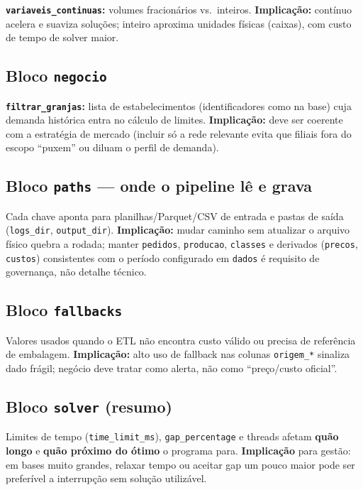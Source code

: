 \documentclass[11pt,a4paper]{article}
\begin{document}
\textbf{\texttt{variaveis\_continuas}:} volumes fracionários vs.\ inteiros.
\textbf{Implicação:} contínuo acelera e suaviza soluções; inteiro aproxima
unidades físicas (caixas), com custo de tempo de solver maior.

\subsection{Bloco \texttt{negocio}}

\textbf{\texttt{filtrar\_granjas}:} lista de estabelecimentos (identificadores
como na base) cuja demanda histórica entra no cálculo de limites. \textbf{Implicação:}
deve ser coerente com a estratégia de mercado (incluir só a rede relevante evita
que filiais fora do escopo ``puxem'' ou diluam o perfil de demanda).

\subsection{Bloco \texttt{paths} --- onde o pipeline lê e grava}

Cada chave aponta para planilhas/Parquet/CSV de entrada e pastas de saída
(\texttt{logs\_dir}, \texttt{output\_dir}). \textbf{Implicação:} mudar caminho
sem atualizar o arquivo físico quebra a rodada; manter \texttt{pedidos},
\texttt{producao}, \texttt{classes} e derivados (\texttt{precos},
\texttt{custos}) consistentes com o período configurado em \texttt{dados} é
requisito de governança, não detalhe técnico.

\subsection{Bloco \texttt{fallbacks}}

Valores usados quando o ETL não encontra custo válido ou precisa de referência
de embalagem. \textbf{Implicação:} alto uso de fallback nas colunas
\texttt{origem\_*} sinaliza dado frágil; negócio deve tratar como alerta, não
como ``preço/custo oficial''.

\subsection{Bloco \texttt{solver} (resumo)}

Limites de tempo (\texttt{time\_limit\_ms}), \texttt{gap\_percentage} e threads
afetam \textbf{quão longo} e \textbf{quão próximo do ótimo} o programa para.
\textbf{Implicação} para gestão: em bases muito grandes, relaxar tempo ou aceitar
gap um pouco maior pode ser preferível a interrupção sem solução utilizável.
\end{document}
